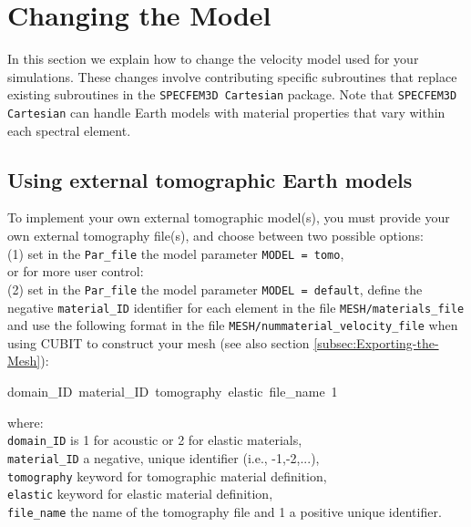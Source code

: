 \chapter{Changing the Model}\label{cha:-Changing-the}

In this section we explain how to change the velocity model used for
your simulations. These changes involve contributing specific subroutines
that replace existing subroutines in the \texttt{SPECFEM3D Cartesian}
package. Note that \texttt{SPECFEM3D Cartesian} can handle Earth models
with material properties that vary within each spectral element.


\section{Using external tomographic Earth models}\label{sec:Using-tomographic}

To implement your own external tomographic model(s), you must provide
your own external tomography file(s), and choose between two possible
options:\\
 \indent (1) set in the \texttt{Par\_file} the model parameter \texttt{MODEL
= tomo}, \\
 or for more user control: \\
 \indent (2) set in the \texttt{Par\_file} the model parameter \texttt{MODEL
= default}, define the negative \texttt{material\_ID} identifier for
each element in the file \texttt{MESH/materials\_file} and use the
following format in the file \texttt{MESH/nummaterial\_velocity\_file}
when using CUBIT to construct your mesh (see also section \ref{subsec:Exporting-the-Mesh}):
\begin{lyxcode}
domain\_ID~material\_ID~tomography~elastic~file\_name~1
\end{lyxcode}
where: \\
 \indent \texttt{domain\_ID} is 1 for acoustic or 2 for elastic materials,
\\
 \indent \texttt{material\_ID} a negative, unique identifier (i.e.,
-1,-2,...), \\
 \indent \texttt{tomography} keyword for tomographic material definition,
\\
 \indent \texttt{elastic} keyword for elastic material definition,
\\
 \indent \texttt{file\_name} the name of the tomography file and
1 a positive unique identifier.\\


